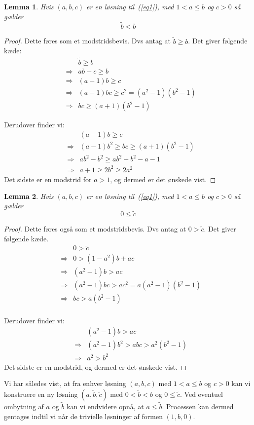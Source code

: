 \documentclass[12pt,oneside,a4paper]{article}
\newcommand{\bas}{\begin{eqnarray*}}
\newcommand{\eas}{\end{eqnarray*}}
\newtheorem{lem}{Lemma}[section]
\begin{document}
\begin{lem}
    Hvis $(a,b,c)$ er en løsning til~(\ref{eq1}), med $1<a\le b$ og $c>0$
    så gælder
    $$
    \tilde b < b
    $$
\end{lem}
\begin{proof}
    Dette føres som et modstridsbevis. Dvs antag at $\tilde b \ge b$. Det giver
    følgende kæde:
    \bas
    && \tilde b \ge b \\
    &\Rightarrow& ab-c \ge b \\
    &\Rightarrow& (a-1)b \ge c \\
    &\Rightarrow& (a-1)bc \ge c^2 = (a^2-1)(b^2-1) \\
    &\Rightarrow& bc \ge (a+1)(b^2-1)
    \eas
    
    Derudover finder vi:
    \bas
    && (a-1)b \ge c \\
    &\Rightarrow& (a-1)b^2 \ge bc \ge (a+1)(b^2-1) \\
    &\Rightarrow& ab^2-b^2 \ge ab^2+b^2-a-1 \\
    &\Rightarrow& a+1 \ge 2b^2 \ge 2a^2
    \eas
    Det sidste er en modstrid for $a>1$, og dermed er det ønskede vist.
\end{proof}

\begin{lem}
    Hvis $(a,b,c)$ er en løsning til~(\ref{eq1}), med $1<a\le b$ og $c>0$
    så gælder
    $$
    0 \le \tilde c
    $$
\end{lem}
\begin{proof}
    Dette føres også som et modstridsbevis. Dvs antag at $0 > \tilde c$. Det
    giver følgende kæde.
    \bas
    &&0 > \tilde c\\
    &\Rightarrow& 0 > (1-a^2)b+ac \\
    &\Rightarrow& (a^2-1)b > ac \\
    &\Rightarrow& (a^2-1)bc > ac^2 = a(a^2-1)(b^2-1) \\
    &\Rightarrow& bc > a(b^2-1) \\
    \eas
    
    Derudover finder vi:
    \bas
    && (a^2-1)b > ac \\
    &\Rightarrow& (a^2-1)b^2 > abc > a^2(b^2-1) \\
    &\Rightarrow& a^2 > b^2
    \eas
    Det sidste er en modstrid, og dermed er det ønskede vist.
\end{proof}

Vi har således vist, at fra enhver løsning $(a,b,c)$ med $1<a\le b$ og $c>0$
kan vi konstruere en ny løsning $(a, \tilde b, \tilde c)$ med $0<\tilde b < b$
og $0 \le \tilde c$. Ved eventuel ombytning af $a$ og $\tilde b$ kan vi
endvidere opnå, at $a\le\tilde b$. Processen kan dermed gentages indtil vi når
de trivielle løsninger af formen $(1, b, 0)$.
\end{document}
